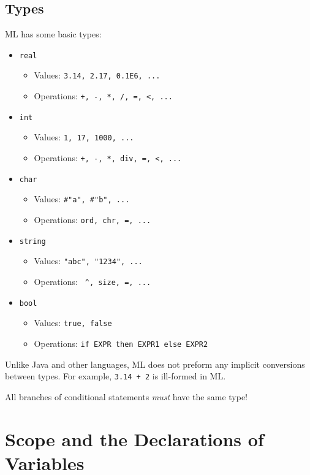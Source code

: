 \documentclass[11pt]{article}
\begin{document}
\subsection{Types}

ML has some basic types:
\begin{itemize}
	\item \verb~real~
		\begin{itemize}
			\item Values: \verb~3.14, 2.17, 0.1E6, ...~
			\item Operations: \verb~+, -, *, /, =, <, ...~
		\end{itemize}
	\item \verb~int~
		\begin{itemize}
			\item Values: \verb~1, 17, 1000, ...~
			\item Operations: \verb~+, -, *, div, =, <, ...~
		\end{itemize}
	\item \verb~char~
		\begin{itemize}
			\item Values: \verb~#"a", #"b", ...~
			\item Operations: \verb~ord, chr, =, ...~
		\end{itemize}
	\item \verb~string~
		\begin{itemize}
			\item Values: \verb~"abc", "1234", ...~
			\item Operations: \verb~ ^, size, =, ...~
		\end{itemize}
	\item \verb~bool~
		\begin{itemize}
			\item Values: \verb~true, false~
			\item Operations: \verb~if EXPR then EXPR1 else EXPR2~
		\end{itemize}
\end{itemize}

Unlike Java and other languages, ML does not preform any implicit conversions between types. For example, \verb~3.14 + 2~ is ill-formed in ML.

All branches of conditional statements \emph{must} have the same type!


\section{Scope and the Declarations of Variables}
\end{document}
